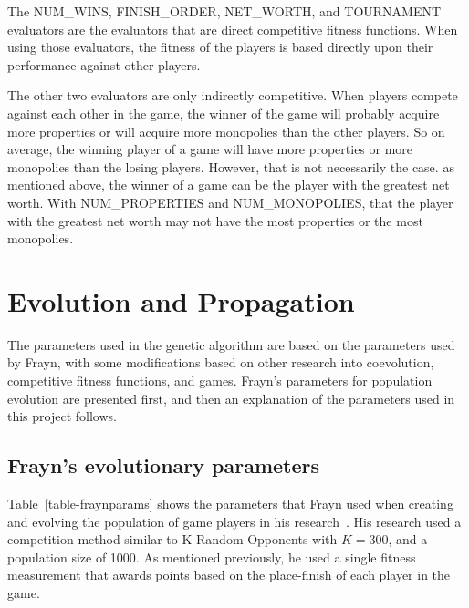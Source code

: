 The NUM\_WINS, FINISH\_ORDER, NET\_WORTH, and TOURNAMENT evaluators are the
evaluators that are direct competitive fitness functions. When using those
evaluators, the fitness of the players is based directly upon their performance
against other players.

The other two evaluators are only indirectly competitive. When players compete
against each other in the game, the winner of the game will probably 
acquire more properties or will acquire more monopolies than the other players.
So on average, the winning player of a game will have more properties or more
monopolies than the losing players. However, that is not necessarily the case.
as mentioned above, the winner of a game can be the player with the greatest net
worth. With NUM\_PROPERTIES and NUM\_MONOPOLIES, that the player with the
greatest net worth may not have the most properties or the most monopolies.

\section{Evolution and Propagation} \label{5_evoprop}

The parameters used in the genetic algorithm are based on the parameters used by
Frayn, with some modifications based on other research into coevolution,
competitive fitness functions, and games. Frayn's parameters for population evolution
are presented first, and then an explanation of the parameters
used in this project follows.

\subsection{Frayn's evolutionary parameters}

Table~\ref{table-fraynparams} shows the parameters that Frayn used when creating
and evolving the population of game players in his
research~\cite{DBLP:conf/cig/Frayn05}. His research used a competition method
similar to K-Random Opponents with \(K=300\), and a population size of 1000. As
mentioned previously, he used a single fitness measurement that awards points
based on the place-finish of each player in the game.

